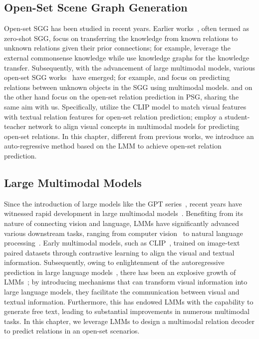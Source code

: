 \subsection{Open-Set Scene Graph Generation}
Open-set SGG has been studied in recent years. 
Earlier works~\citep{kan2021zero, yu2022zero}, often termed as zero-shot SGG, focus on transferring the knowledge from known relations to unknown relations given their prior connections; for example, \citet{kan2021zero} leverage the external commonsense knowledge while \citet{yu2022zero} use knowledge graphs for the knowledge transfer.
Subsequently, with the advancement of large multimodal models, various open-set SGG works~\citep{he2022towards, zhang2023learning, yu2023visually, chen2023expanding} have emerged; for example, \citet{he2022towards} and \citet{zhang2023learning} focus on predicting relations between unknown objects in the SGG using multimodal models.
\citet{yu2023visually} and \citet{chen2023expanding} on the other hand focus on the open-set relation prediction in PSG, sharing the same aim with us.
Specifically, \citet{yu2023visually} utilize the CLIP model to match visual features with textual relation features for open-set relation prediction; \citet{chen2023expanding} employ a student-teacher network to align visual concepts in multimodal models for predicting open-set relations.
In this chapter, different from previous works, we introduce an auto-regressive method based on the LMM to achieve open-set relation prediction.

\subsection{Large Multimodal Models}
Since the introduction of large models like the GPT series~\citep{achiam2023gpt}, recent years have witnessed rapid development in large multimodal models~\citep{radford2021learning, li2023blip, liu2024visual}.
Benefiting from its nature of connecting vision and language, LMMs have significantly advanced various downstream tasks, ranging from computer vision~\citep{du2022learning, yu2023towards} to natural language processing~\citep{wang2020language, joshi2019bert, raffel2020exploring}. 
Early multimodal models, such as CLIP~\citep{radford2021learning}, trained on image-text paired datasets through contrastive learning to align the visual and textual information.
Subsequently, owing to enlightenment of the autoregressive prediction in large language models~\citep{achiam2023gpt, touvron2023llama}, there has been an explosive growth of LMMs~\citep{li2023blip, liu2023improved, liu2024visual}; by introducing mechanisms that can transform visual information into large language models, they facilitate the communication between visual and textual information.
Furthermore, this has endowed LMMs with the capability to generate free text, leading to substantial improvements in numerous multimodal tasks.
In this chapter, we leverage LMMs to design a multimodal relation decoder to predict relations in an open-set scenarios.


